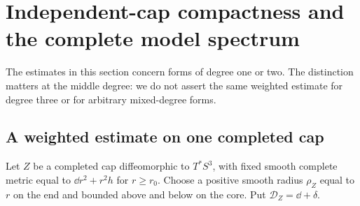 \section{Independent-cap compactness and the complete model spectrum}
\label{sec:model-compactness}

The estimates in this section concern forms of degree one or two.
The distinction matters at the middle degree: we do not assert the
same weighted estimate for degree three or for arbitrary mixed-degree
forms.

\subsection{A weighted estimate on one completed cap}

Let $Z$ be a completed cap diffeomorphic to $T^*S^3$, with fixed smooth
complete metric equal to $\dd r^2+r^2h$ for $r\ge r_0$. Choose a
positive smooth radius $\rho_Z$ equal to $r$ on the end and bounded
above and below on the core. Put $\mathcal D_Z=\dd+\delta$.

